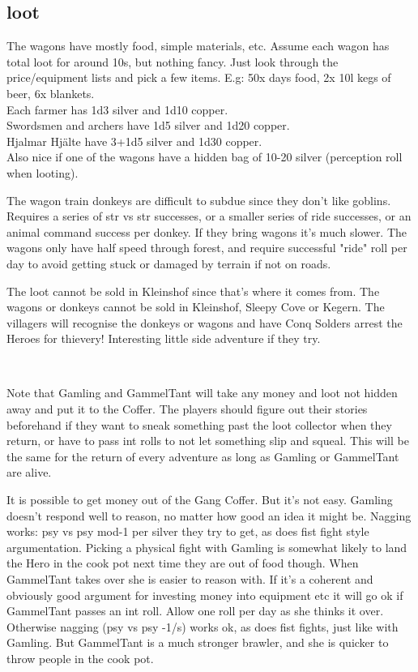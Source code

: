 \subsection*{loot}

The wagons have mostly food, simple materials, etc. Assume each wagon has total loot for around 10s, but nothing fancy. Just look through the price/equipment lists and pick a few items. E.g: 50x days food, 2x 10l kegs of beer, 6x blankets.\\
Each farmer has 1d3 silver and 1d10 copper.\\
Swordsmen and archers have 1d5 silver and 1d20 copper.\\
Hjalmar Hjälte have 3+1d5 silver and 1d30 copper.\\
Also nice if one of the wagons have a hidden bag of 10-20 silver (perception roll when looting).

The wagon train donkeys are difficult to subdue since they don't like goblins. Requires a series of str vs str successes, or a smaller series of ride successes, or an animal command success per donkey. If they bring wagons it's much slower. The wagons only have half speed through forest, and require successful "ride" roll per day to avoid getting stuck or damaged by terrain if not on roads.

The loot cannot be sold in Kleinshof since that's where it comes from. The wagons or donkeys cannot be sold in Kleinshof, Sleepy Cove or Kegern. The villagers will recognise the donkeys or wagons and have Conq Solders arrest the Heroes for thievery! Interesting little side adventure if they try.

\

Note that Gamling and GammelTant will take any money and loot not hidden away and put it to the Coffer. The players should figure out their stories beforehand if they want to sneak something past the loot collector when they return, or have to pass int rolls to not let something slip and squeal. This will be the same for the return of every adventure as long as Gamling or GammelTant are alive.

It is possible to get money out of the Gang Coffer. But it's not easy. Gamling doesn't respond well to reason, no matter how good an idea it might be. Nagging works: psy vs psy mod-1 per silver they try to get, as does fist fight style argumentation. Picking a physical fight with Gamling is somewhat likely to land the Hero in the cook pot next time they are out of food though. When GammelTant takes over she is easier to reason with. If it's a coherent and obviously good argument for investing money into equipment etc it will go ok if GammelTant passes an int roll. Allow one roll per day as she thinks it over. Otherwise nagging (psy vs psy -1/s) works ok, as does fist fights, just like with Gamling. But GammelTant is a much stronger brawler, and she is quicker to throw people in the cook pot.

